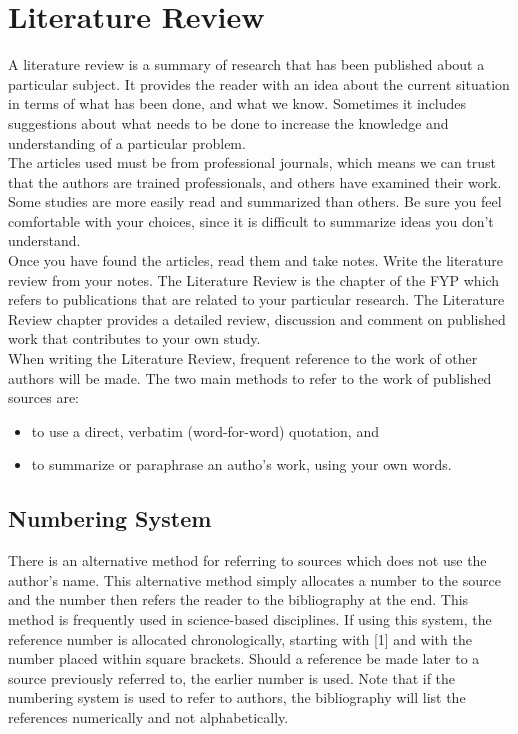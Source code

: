 \chapter{Literature Review} 

A literature review is a summary of research that has been published about a particular subject. 
It provides the reader with an idea about the current situation in terms of what has 
been done, and what we know. Sometimes it includes suggestions about what needs to be done 
to increase the knowledge and understanding of a particular problem.
\\
The articles used must be from professional journals, which means we can trust that the authors 
are trained professionals, and others have examined their work. Some studies are more easily read 
and summarized than others. Be sure you feel comfortable with your choices, since it is difficult 
to summarize ideas you don't understand.
\\
Once you have found the articles, read them and take notes. Write the literature review from your notes.
The Literature Review is the chapter of the FYP which refers to publications that are related to your 
particular research. The Literature Review
chapter provides a detailed review, discussion and comment on published work that contributes to your own study.
\\
When writing the Literature Review, frequent reference to the work of other 
authors will be made. The two main methods to refer to the work of published sources are:
\begin{itemize}
 \item to use a direct, verbatim (word-for-word) quotation, and
 \item to summarize or paraphrase an autho's work, using your own words.
\end{itemize}

\section{Numbering System}
There is an alternative method for referring to sources which does not use the author's name. 
This alternative method simply allocates a number to the source and the number then refers the
reader to the bibliography at the end. This method is frequently used
in science-based disciplines. If using this system, the reference number is allocated
chronologically, starting with [1] and with the number placed within square brackets. Should a 
reference be made later to a source previously referred to, the earlier number is used.
Note that if the numbering system is used to refer to authors, the bibliography will list 
the references numerically and not alphabetically.

